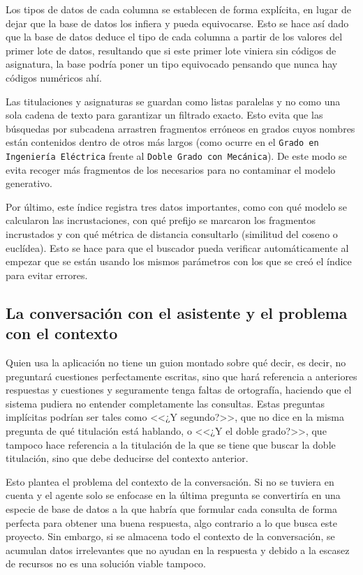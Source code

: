 Los tipos de datos de cada columna se establecen de forma explícita, en lugar de dejar que la base de datos los infiera y pueda equivocarse. Esto se hace así dado que la base de datos deduce el tipo de cada columna a partir de los valores del primer lote de datos, resultando que si este primer lote viniera sin códigos de asignatura, la base podría poner un tipo equivocado pensando que nunca hay códigos numéricos ahí.

Las titulaciones y asignaturas se guardan como listas paralelas y no como una sola cadena de texto para garantizar un filtrado exacto. Esto evita que las búsquedas por subcadena arrastren fragmentos erróneos en grados cuyos nombres están contenidos dentro de otros más largos (como ocurre en el \texttt{Grado en Ingeniería Eléctrica} frente al \texttt{Doble Grado con Mecánica}). De este modo se evita recoger más fragmentos de los necesarios para no contaminar el modelo generativo.


Por último, este índice registra tres datos importantes, como con qué modelo se calcularon las incrustaciones, con qué prefijo se marcaron los fragmentos incrustados y con qué métrica de distancia consultarlo (similitud del coseno o euclídea). Esto se hace para que el buscador pueda verificar automáticamente al empezar que se están usando los mismos parámetros con los que se creó el índice para evitar errores.


\subsection[La conversación con el asistente]{La conversación con el asistente y el problema con el contexto}
\label{secc:fase2_conversacion}

Quien usa la aplicación no tiene un guion montado sobre qué decir, es decir, no preguntará cuestiones perfectamente escritas, sino que hará referencia a anteriores respuestas y cuestiones y seguramente tenga faltas de ortografía, haciendo que el sistema pudiera no entender completamente las consultas. Estas preguntas implícitas podrían ser tales como <<¿Y segundo?>>, que no dice en la misma pregunta de qué titulación está hablando, o <<¿Y el doble grado?>>, que tampoco hace referencia a la titulación de la que se tiene que buscar la doble titulación, sino que debe deducirse del contexto anterior.

Esto plantea el problema del contexto de la conversación. Si no se tuviera en cuenta y el agente solo se enfocase en la última pregunta se convertiría en una especie de base de datos a la que habría que formular cada consulta de forma perfecta para obtener una buena respuesta, algo contrario a lo que busca este proyecto. Sin embargo, si se almacena todo el contexto de la conversación, se acumulan datos irrelevantes que no ayudan en la respuesta y debido a la escasez de recursos no es una solución viable tampoco.


